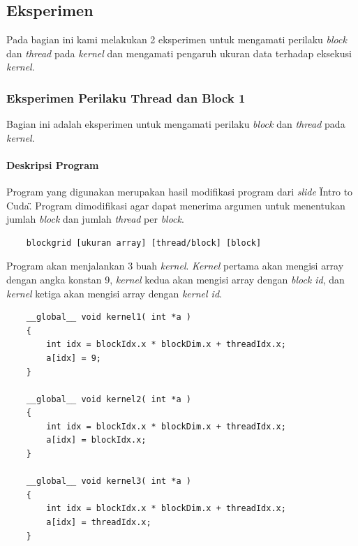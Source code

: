 \chapter{\topikSatu}

\section{Eksperimen}
Pada bagian ini kami melakukan 2 eksperimen untuk mengamati perilaku \textit{block} dan \textit{thread} pada \textit{kernel} dan mengamati pengaruh ukuran data terhadap eksekusi \textit{kernel}.

\subsection{Eksperimen Perilaku Thread dan Block 1} 

Bagian ini adalah eksperimen untuk mengamati perilaku \textit{block} dan \textit{thread} pada \textit{kernel}.

\subsubsection{Deskripsi Program}

Program yang digunakan merupakan hasil modifikasi program dari \textit{slide} \"Intro to Cuda\".  Program dimodifikasi agar dapat menerima argumen untuk menentukan jumlah \textit{block} dan jumlah \textit{thread} per \textit{block}.

	\begin{lstlisting}
	blockgrid [ukuran array] [thread/block] [block]
	\end{lstlisting}

Program akan menjalankan 3 buah \textit{kernel}.  \textit{Kernel} pertama akan mengisi array dengan angka konstan 9, \textit{kernel} kedua akan mengisi array dengan \textit{block id}, dan \textit{kernel} ketiga akan mengisi array dengan \textit{kernel id}.

	\begin{lstlisting}
	__global__ void kernel1( int *a )
	{
	    int idx = blockIdx.x * blockDim.x + threadIdx.x;
	    a[idx] = 9;
	}
	
	__global__ void kernel2( int *a )
	{
	    int idx = blockIdx.x * blockDim.x + threadIdx.x;
	    a[idx] = blockIdx.x;
	}
	
	__global__ void kernel3( int *a )
	{
	    int idx = blockIdx.x * blockDim.x + threadIdx.x;
	    a[idx] = threadIdx.x;
	}
	\end{lstlisting}
	
